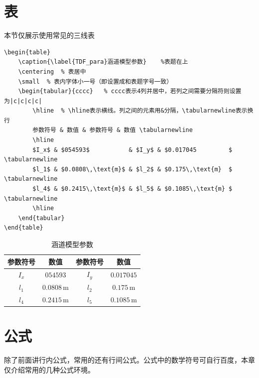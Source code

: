\section{表}
本节仅展示使用常见的三线表
\begin{lstlisting}
\begin{table}
	\caption{\label{TDF_para}涵道模型参数}	%表题在上
	\centering	% 表居中
	\small	% 表内字体小一号（即设置成和表题字号一致）
	\begin{tabular}{cccc}	% cccc表示4列并居中，若列之间需要分隔符则设置为|c|c|c|c|
		\hline	% \hline表示横线。列之间的元素用&分隔，\tabularnewline表示换行
		参数符号 & 数值 & 参数符号 & 数值 \tabularnewline 
		\hline 
		$I_x$ & $054593$ 		   & $I_y$ & $0.017045         $ \tabularnewline
		$l_1$ & $0.0808\,\text{m}$ & $l_2$ & $0.175\,\text{m}  $ \tabularnewline 
		$l_4$ & $0.2415\,\text{m}$ & $l_5$ & $0.1085\,\text{m} $ \tabularnewline
		\hline 
	\end{tabular}
\end{table}
\end{lstlisting}
\begin{table}
	\caption{\label{TDF_para}涵道模型参数}
	\centering
	\small 
	\begin{tabular}{cccc}
		\hline 
		参数符号 & 数值                & 参数符号 & 数值                 \tabularnewline
		\hline 
		$I_x$   & $054593$ 		     & $I_y$   & $0.017045         $ \tabularnewline
		$l_1$   & $0.0808\,\text{m}$ & $l_2$   & $0.175\,\text{m}  $ \tabularnewline 
		$l_4$   & $0.2415\,\text{m}$ & $l_5$   & $0.1085\,\text{m} $ \tabularnewline
		\hline 
	\end{tabular}
\end{table}

\section{公式}
除了前面讲行内公式，常用的还有行间公式。公式中的数学符号可自行百度，本章仅介绍常用的几种公式环境。

